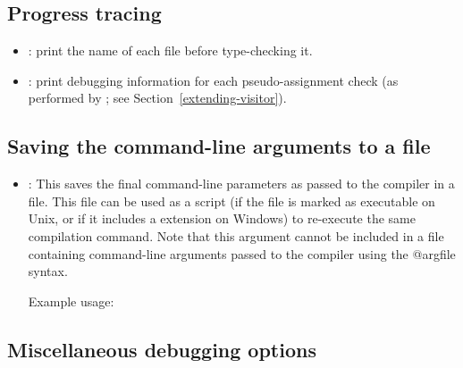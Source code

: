 \subsection{Progress tracing\label{debugging-options-progress}}

\begin{itemize}

\item {}: print the name of each file before type-checking it.

\item {}: print debugging information for each
pseudo-assignment check (as performed by
; see
Section~\ref{extending-visitor}).

\end{itemize}

\subsection{Saving the command-line arguments to a file\label{debugging-options-output-args}}

\begin{itemize}

\item {}:
  This saves the final command-line parameters as passed to the compiler in a file.
  This file can be used as a script (if the file is marked as executable on Unix, or
  if it includes a  extension on Windows) to re-execute the same compilation command.
  Note that this argument cannot be included in a file containing command-line arguments
  passed to the compiler using the @argfile syntax.

  Example usage: 

\end{itemize}

\subsection{Miscellaneous debugging options\label{debugging-options-misc}}

